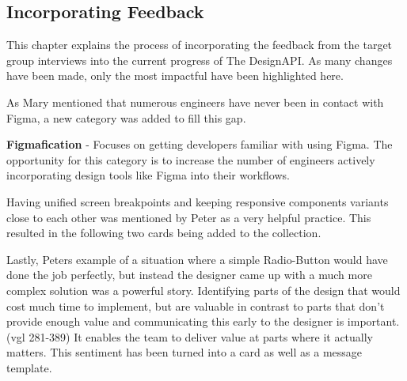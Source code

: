 \newpage
\subsection{Incorporating Feedback}
This chapter explains the process of incorporating the feedback from the target group interviews
into the current progress of The DesignAPI. As many changes have been made, only the most impactful
have been highlighted here.

As Mary mentioned that numerous engineers have never been in contact with Figma, a new category was
added to fill this gap.

\textbf{Figmafication} - Focuses on getting developers familiar with using Figma. The
opportunity for this category is to increase the number of engineers actively
incorporating design tools like Figma into their workflows.

Having unified screen breakpoints and keeping responsive components variants close to each other was
mentioned by Peter as a very helpful practice. This resulted in the following two cards being added
to the collection. 

Lastly, Peters example of a situation where a simple Radio-Button would have done the job perfectly,
but instead the designer came up with a much more complex solution was a powerful story. 
Identifying parts of the design that would cost much time to implement, but are valuable in contrast
to parts that don't provide enough value and communicating this early to the designer is important.
(vgl 281-389)
It enables the team to deliver value at parts where it actually matters. This sentiment has been
turned into a card as well as a message template.
